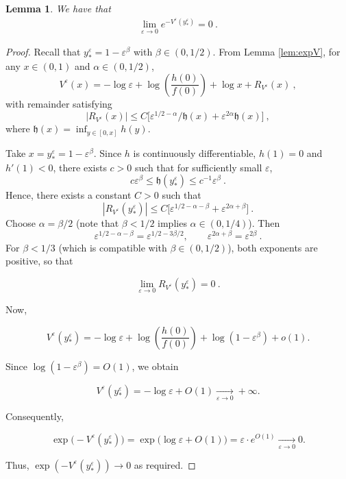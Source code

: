 \documentclass[10pt,a4paper]{amsart}
\newtheorem{lemma}{Lemma}
\begin{document}
\begin{lemma}
\label{lem:Vyepsilonstar}
We have that 
\begin{equation}
%
\begin{split}
\lim_{\varepsilon \to 0} e^{-V^\varepsilon (y_*^\varepsilon)} = 0 \ .
\end{split}
\end{equation}
\end{lemma}

\begin{proof}
Recall that \(y_*^\varepsilon = 1 - \varepsilon^\beta\) with \(\beta \in (0,1/2)\).  From Lemma \ref{lem:expV}, for any \(x \in (0,1)\) and \(\alpha \in (0,1/2)\),
\[
V^\varepsilon(x) = -\log \varepsilon + \log\left(\frac{h(0)}{f(0)}\right) + \log x + R_{V^\varepsilon}(x) \ ,
\]
with remainder satisfying
\[
|R_{V^\varepsilon}(x)| \leq C\bigl[\varepsilon^{1/2-\alpha}/\mathfrak{h}(x) + \varepsilon^{2\alpha}\mathfrak{h}(x)\bigr] \ ,
\]
where \(\mathfrak{h}(x) = \inf_{y\in[0,x]} h(y)\).

\bigskip

Take \(x = y_*^\varepsilon = 1 - \varepsilon^\beta\).   Since \(h\) is continuously differentiable, \(h(1)=0\) and $h'(1)<0$, there exists \(c>0\) such that for sufficiently small \(\varepsilon\),
\[
c \varepsilon^\beta \le \mathfrak{h}(y_*^\varepsilon) \le c^{-1} \varepsilon^\beta \ .
\]
Hence, there exists a constant $C>0$ such that
\[
|R_{V^\varepsilon}(y_*^\varepsilon)| \leq C\bigl[\varepsilon^{1/2-\alpha - \beta} + \varepsilon^{2\alpha+\beta}\bigr] \ .
\]
Choose \(\alpha = \beta/2\) (note that \(\beta<1/2\) implies \(\alpha\in(0,1/4)\)). Then
\[
\varepsilon^{1/2-\alpha-\beta} = \varepsilon^{1/2 - 3\beta/2}, \qquad \varepsilon^{2\alpha+\beta} = \varepsilon^{2\beta} \ .
\]
For \(\beta < 1/3\) (which is compatible with \(\beta\in(0,1/2)\)), both exponents are positive, so that 

\[
\lim_{\varepsilon \to 0} R_{V^\varepsilon}(y_*^\varepsilon) =0 \ .
\]

\bigskip

Now,

\[
V^\varepsilon(y_*^\varepsilon) = -\log \varepsilon + \log\left(\frac{h(0)}{f(0)}\right) + \log(1-\varepsilon^\beta) + o(1).
\]

Since \(\log(1-\varepsilon^\beta) = O(1)\), we obtain

\[
V^\varepsilon(y_*^\varepsilon) = -\log \varepsilon + O(1) \xrightarrow[\varepsilon\to0]{} +\infty.
\]

\bigskip

Consequently,

\[
\exp\bigl(-V^\varepsilon(y_*^\varepsilon)\bigr) = \exp\bigl(\log\varepsilon + O(1)\bigr) = \varepsilon \cdot e^{O(1)} \xrightarrow[\varepsilon\to0]{} 0.
\]

\bigskip

Thus, \(\exp(-V^\varepsilon(y_*^\varepsilon)) \to 0\) as required.

\end{proof}
\end{document}
